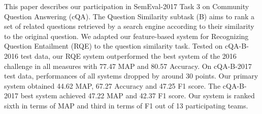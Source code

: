 This paper describes our participation in SemEval-2017 Task 3 on Community Question  Answering (cQA). The Question Similarity subtask (B) aims to rank  a set of related questions retrieved by a search engine according to their similarity to the original question. We adapted our feature-based system for Recognizing Question Entailment (RQE) to the question similarity task. Tested on cQA-B-2016 test data, our RQE system outperformed the best system of the 2016 challenge in all measures with 77.47 MAP and 80.57 Accuracy. On cQA-B-2017 test data, performances of all systems dropped by around 30 points. Our primary system obtained 44.62 MAP, 67.27 Accuracy and 47.25 F1 score. The cQA-B-2017 best system achieved 47.22 MAP and 42.37 F1 score. Our system is ranked sixth in terms of MAP and third in terms of F1 out of 13 participating teams.
